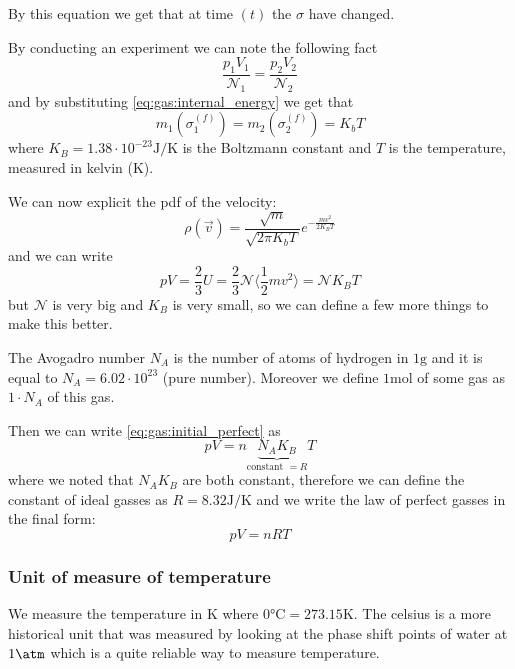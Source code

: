 \documentclass[12pt]{extarticle}
\newcommand{\anglebraces}[1]{
    \langle #1 \rangle
}
\begin{document}
By this equation we get that at time $(t)$ the $\sigma$ have changed.

By conducting an experiment we can note the following fact
\begin{equation}
    \frac{p_1 V_1}{\mathscr{N}_1} = \frac{p_2 V_2}{\mathscr{N}_2}
\end{equation}
and by substituting \autoref{eq:gas:internal_energy} we get that
\begin{equation}
    m_1 \left( \sigma_1^{(f)} \right) = m_2 \left(\sigma_2^{(f)}\right) = K_b T
\end{equation}
where $K_B = 1.38 \cdot 10^{-23} \si{\joule \per \kelvin}$ is the Boltzmann constant and $T$ is the temperature, measured in kelvin ($\si{\kelvin}$).

We can now explicit the pdf of the velocity:
\begin{equation}
    \rho(\vec v) = \frac{\sqrt{m}}{\sqrt{2 \pi K_b T}} e^{- \frac{m v^2}{2 K_B T}}
\end{equation}
and we can write
\begin{equation}
    \label{eq:gas:initial_perfect}
    p V = \frac{2}{3}U = \frac{2}{3}\mathscr{N} \anglebraces{\frac{1}{2}mv^2} = \mathscr{N}K_B T
\end{equation}
but $\mathscr{N}$ is very big and $K_B$ is very small, so we can define a few more things to make this better.

The Avogadro number $N_A$ is the number of atoms of hydrogen in $1 \si{\gram}$ and it is equal to $N_A = 6.02 \cdot 10^{23}$ (pure number).
Moreover we define $1 \si{\mole}$ of some gas as $1 \cdot N_A$ of this gas.

Then we can write \autoref{eq:gas:initial_perfect} as
\begin{equation}
    pV = n \underbrace{N_A K_B}_{\text{constant } = R} T
\end{equation}
where we noted that $N_A K_B$ are both constant, therefore we can define the constant of ideal gasses as $R = 8.32 \si{\joule \per \kelvin}$ and we write the law of perfect gasses in the final form:
\begin{equation}
    \label{eq:gas:perfect}
    pV = nRT
\end{equation}

\subsubsection{Unit of measure of temperature}

We measure the temperature in $\si{\kelvin}$ where $0 \si{\celsius} = 273.15 \si{\kelvin}$.
The celsius is a more historical unit that was measured by looking at the phase shift points of water at $1 \si{\atm}$ which is a quite reliable way to measure temperature.
\end{document}
